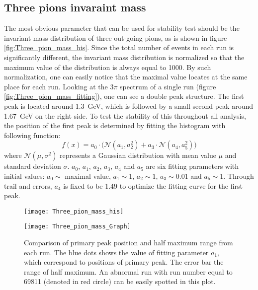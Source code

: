 \subsection{Three pions invaraint mass}
The most obvious parameter that can be used for stability test should be the invariant mass distribution of three out-going pions, as is shown in figure \ref{fig:Three_pion_mass_his}. Since the total number of events in each run is significantly different, the invariant mass distribution is normalized so that the maximum value of the distribution is always equal to 1000. By such normalization, one can easily notice that the maximal value locates at the same place for each run. Looking at the $3\pi$ spectrum of a single run (figure \ref{fig:Three_pion_mass_fitting}), one can see a double peak structure. The first peak is located around \SI{1.3}{\giga\electronvolt}, which is followed by a small second peak around \SI{1.67}{\giga\electronvolt} on the right side. To test the stability of this throughout all analysis, the position of the first peak is determined by fitting the histogram with following function:
\begin{equation}
f(x) = a_0 \cdot \Big(\mathcal{N}(a_1, a_2^2)+a_3 \cdot \mathcal{N}(a_4, a_5^2)\Big)
\end{equation}
where $\mathcal{N}(\mu,\sigma^2)$ represents a Gaussian distribution with mean value $\mu$ and standard deviation $\sigma$. $a_0$, $a_1$, $a_2$, $a_3$, $a_4$ and $a_5$ are six fitting parameters with initial values: $a_0 \sim$ maximal value, $a_1 \sim 1$, $a_2 \sim 1$, $a_3 \sim 0.01$ and $a_5 \sim 1$. Through trail and errors, $a_4$ is fixed to be 1.49 to optimize the fitting curve for the first peak.

\begin{figure*}[!ht]
	\centering
	\vspace{2cm}
	\texttt{[image: Three\_pion\_mass\_his]}
	\caption{Histogram of the three pion invariant mass for each run. The colors inside the histogram represent the number of events for each run and invariant mass. To better compare and conceive the structure of the distribution between runs visually, the maximal value of each distribution is normalized to 1000. As one can easily notice that maximal value or peak of distribution locates around \SI{1.3}{\giga\electronvolt} for almost every run.}
	\label{fig:Three_pion_mass_his}
	\vspace{2 cm}
	
	\texttt{[image: Three\_pion\_mass\_Graph]}
	\caption{Comparison of primary peak position and half maximum range from each run. The blue dots shows the value of fitting parameter $a_1$, which correspond to positions of primary peak. The error bar the range of half maximum. An abnormal run with run number equal to 69811 (denoted in red circle) can be easily spotted in this plot.}
	\label{fig:Three_pion_mass_Graph}
	\vspace{2cm}
\end{figure*}

